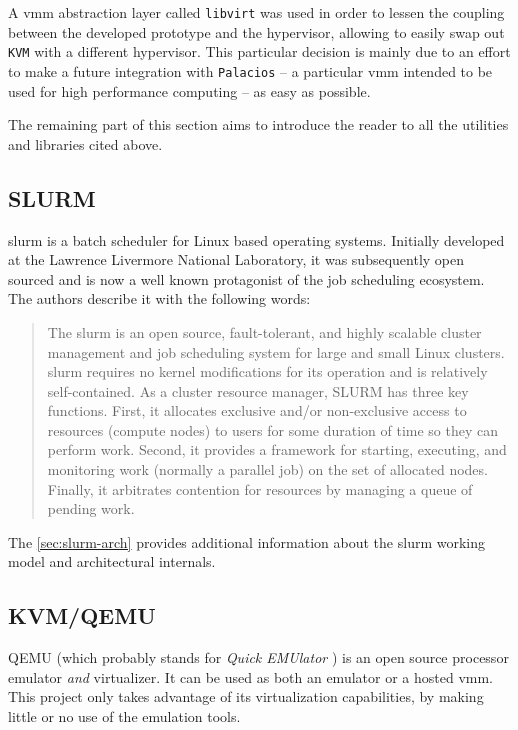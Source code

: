 A \gls{vmm} abstraction layer called \texttt{libvirt} was used in order to lessen the coupling between the developed prototype and the hypervisor, allowing to easily swap out \texttt{KVM} with a different hypervisor. This particular decision is mainly due to an effort to make a future integration with \texttt{Palacios} -- a particular \gls{vmm} intended to be used for high performance computing -- as easy as possible.

The remaining part of this section aims to introduce the reader to all the utilities and libraries cited above.

\subsection*{SLURM}
\label{sec:slurm}

\gls{slurm} is a batch scheduler for Linux based operating systems. Initially developed at the Lawrence Livermore National Laboratory, it was subsequently open sourced and is now a well known protagonist of the job scheduling ecosystem. The authors \cite{slurm-www} describe it with the following words:

\begin{quote}
The \gls{slurm} is an open source, fault-tolerant, and highly scalable cluster management and job scheduling system for large and small Linux clusters. \gls{slurm} requires no kernel modifications for its operation and is relatively self-contained. As a cluster resource manager, SLURM has three key functions. First, it allocates exclusive and/or non-exclusive access to resources (compute nodes) to users for some duration of time so they can perform work. Second, it provides a framework for starting, executing, and monitoring work (normally a parallel job) on the set of allocated nodes. Finally, it arbitrates contention for resources by managing a queue of pending work.
\end{quote}

The \autoref{sec:slurm-arch} provides additional information about the \gls{slurm} working model and architectural internals.


\subsection*{KVM/QEMU}
\label{sec:kvm}

QEMU \cite{qemu-www} (which probably stands for \emph{Quick EMUlator} \cite{ubuntu-admin}) is an open source processor emulator \emph{and} virtualizer. It can be used as both an emulator or a hosted \gls{vmm}. This project only takes advantage of its virtualization capabilities, by making little or no use of the emulation tools.


